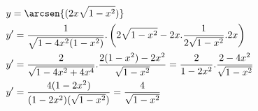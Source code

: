 \begin{ex}
\begin{align}
&y=\arcsen{(2x\sqrt{1-x^2})}\nonumber\\
&y'=\frac{1}{\sqrt{1-4x^2(1-x^2)}}.\left(2\sqrt{1-x^2}-2x.\frac{1}{2\sqrt{1-x^2}}.2x\right)\nonumber\\
&y'=\frac{2}{\sqrt{1-4x^2+4x^4}}.\frac{2(1-x^2)-2x^2}{\sqrt{1-x^2}}=\frac{2}{1-2x^2}.\frac{2-4x^2}{\sqrt{1-x^2}}\nonumber\\
&y'=\frac{4(1-2x^2)}{(1-2x^2)(\sqrt{1-x^2})}=\frac{4}{\sqrt{1-x^2}}\nonumber
\end{align}
\end{ex}
